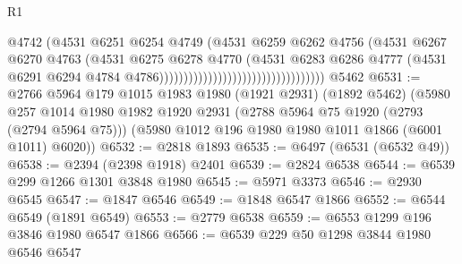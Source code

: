 \begin{lexlean}{R1}
\begin{coremodule}
                                                            @4742
                                                            (@4531
                                                              @6251
                                                              @6254
                                                              @4749
                                                              (@4531
                                                                @6259
                                                                @6262
                                                                @4756
                                                                (@4531
                                                                  @6267
                                                                  @6270
                                                                  @4763
                                                                  (@4531
                                                                    @6275
                                                                    @6278
                                                                    @4770
                                                                    (@4531
                                                                      @6283
                                                                      @6286
                                                                      @4777
                                                                      (@4531
                                                                        @6291
                                                                        @6294
                                                                        @4784
                                                                        @4786))))))))))))))))))))))))))))))))))
    @5462
@6531 := @2766
    @5964
    @179
    @1015
    @1983
    @1980
    (@1921 @2931)
    (@1892 @5462)
    (@5980
      @257
      @1014
      @1980
      @1982
      @1920
      @2931
      (@2788 @5964 @75 @1920 (@2793 (@2794 @5964 @75)))
      (@5980 @1012 @196 @1980 @1980 @1011 @1866 (@6001 @1011) @6020))
@6532 := @2818 @1893
@6535 := @6497 (@6531 (@6532 @49))
@6538 := @2394 (@2398 @1918) @2401
@6539 := @2824 @6538
@6544 := @6539 @299 @1266 @1301 @3848 @1980
@6545 := @5971 @3373
@6546 := @2930 @6545
@6547 := @1847 @6546
@6549 := @1848 @6547 @1866
@6552 := @6544 @6549 (@1891 @6549)
@6553 := @2779 @6538
@6559 := @6553 @1299 @196 @3846 @1980 @6547 @1866
@6566 := @6539 @229 @50 @1298 @3844 @1980 @6546 @6547

\end{coremodule}
\end{lexlean}
